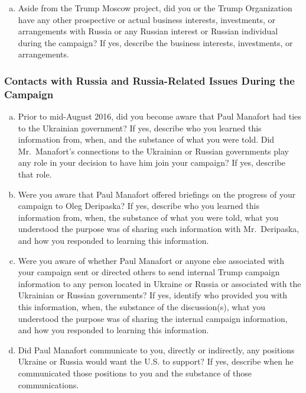 \begin{enumerate}[a.]
\item Aside from the Trump Moscow project, did you or the Trump Organization have any other prospective or actual business interests, investments, or arrangements with Russia or any Russian interest or Russian individual during the campaign?
If yes, describe the business interests, investments, or arrangements.

\end{enumerate}

\subsubsection{Contacts with Russia and Russia-Related Issues During the Campaign}

\begin{enumerate}[a.]

\item Prior to mid-August 2016, did you become aware that Paul Manafort had ties to the Ukrainian government?
If yes, describe who you learned this information from, when, and the substance of what you were told.
Did Mr.~Manafort’s connections to the Ukrainian or Russian governments play any role in your decision to have him join your campaign?
If yes, describe that role.

\item Were you aware that Paul Manafort offered briefings on the progress of your campaign to Oleg Deripaska?
If yes, describe who you learned this information from, when, the substance of what you were told, what you understood the purpose was of sharing such information with Mr.~Deripaska, and how you responded to learning this information.

\item Were you aware of whether Paul Manafort or anyone else associated with your campaign sent or directed others to send internal Trump campaign information to any person located in Ukraine or Russia or associated with the Ukrainian or Russian governments?
If yes, identify who provided you with this information, when, the substance of the discussion(s), what you understood the purpose was of sharing the internal campaign information, and how you responded to learning this information.

\item Did Paul Manafort communicate to you, directly or indirectly, any positions Ukraine or Russia would want the U.S. to support?
If yes, describe when he communicated those positions to you and the substance of those communications.


\end{enumerate}
